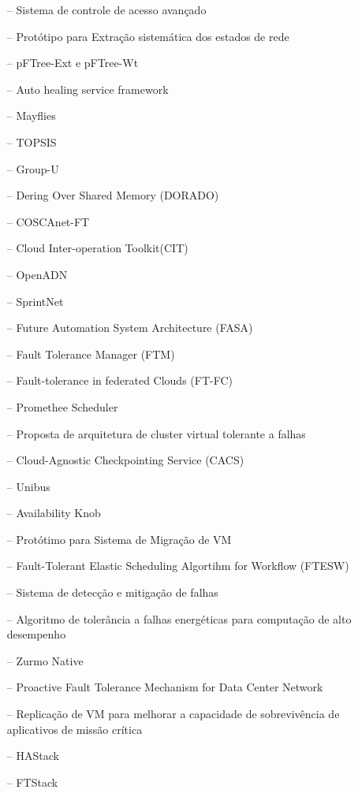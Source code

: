 \documentclass[
	12pt,				%
	oneside,			%
	a4paper,			%
	chapter=TITLE,		%
	english,			%
	french,				%
	spanish,			%
	brazil				%
	]{abntex2}
\begin{document}
\begin{multicols}{2}
\begin{itemize}
    \item[--] Sistema de controle de acesso avançado
    \item[--] Protótipo para Extração sistemática dos estados de rede
    \item[--] pFTree-Ext e pFTree-Wt
    \item[--] Auto healing service framework
    \item[--] Mayflies
    \item[--] TOPSIS
    \item[--] Group-U
    \item[--] Dering Over Shared Memory (DORADO)
    \item[--] COSCAnet-FT
    \item[--] Cloud Inter-operation Toolkit(CIT)
    \item[--] OpenADN
    \item[--] SprintNet
    \item[--] Future Automation System Architecture (FASA)
    \item[--] Fault Tolerance Manager (FTM)
    \item[--] Fault-tolerance in federated Clouds (FT-FC)
    \item[--] Promethee Scheduler
    \item[--] Proposta de arquitetura de cluster virtual tolerante a falhas
    \item[--] Cloud-Agnostic Checkpointing Service (CACS)
    \item[--] Unibus
    \item[--] Availability Knob
    \item[--] Protótimo para Sistema de Migração de VM
    \item[--] Fault-Tolerant Elastic Scheduling Algortihm for Workflow (FTESW)
    \item[--] Sistema de detecção e mitigação de falhas
    \item[--] Algoritmo de tolerância a falhas energéticas para computação de alto desempenho
    \item[--] Zurmo Native
    \item[--] Proactive Fault Tolerance Mechanism for Data Center Network
    \item[--] Replicação de VM para melhorar a capacidade de sobrevivência de aplicativos de missão crítica
    \item[--] HAStack
    \item[--] FTStack
\end{itemize}
\end{multicols}
\end{document}

